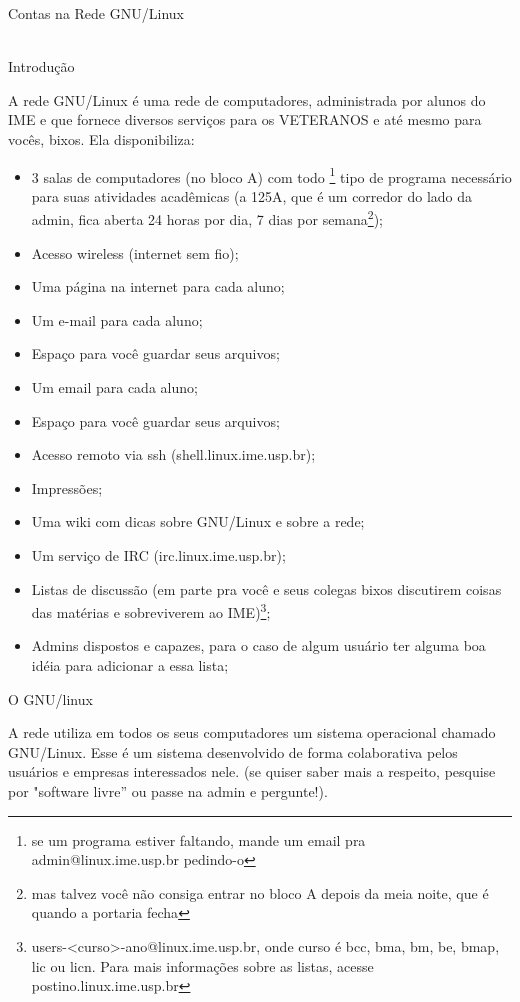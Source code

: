 \begin{secao}{Contas na Rede GNU/Linux}
\\
\\
  \begin{subsecao}{Introdução}


A rede GNU/Linux é uma rede de computadores, administrada por alunos do IME e que fornece diversos serviços para os VETERANOS e até mesmo para vocês, bixos. Ela disponibiliza:

\begin{itemize}
\item 3 salas de computadores (no bloco A) com todo \footnote{se um programa estiver faltando, mande um email pra admin@linux.ime.usp.br pedindo-o} tipo de programa necessário para suas atividades acadêmicas (a 125A, que é um corredor do lado da admin, fica aberta 24 horas por dia, 7 dias por semana\footnote{mas talvez você não consiga entrar no bloco A depois da meia noite, que é quando a portaria fecha});
\item Acesso wireless (internet sem fio);
\item Uma página na internet para cada aluno;
\item Um e-mail para cada aluno;
\item Espaço para você guardar seus arquivos;
\item Um email para cada aluno;
\item Espaço para você guardar seus arquivos;
\item Acesso remoto via ssh (shell.linux.ime.usp.br);
\item Impressões;
\item Uma wiki com dicas sobre GNU/Linux e sobre a rede;
\item Um serviço de IRC (irc.linux.ime.usp.br);
\item Listas de discussão (em parte pra você e seus colegas bixos discutirem coisas das matérias e sobreviverem ao IME)\footnote{ users-<curso>-ano@linux.ime.usp.br, onde curso é bcc, bma, bm, be, bmap, lic ou licn. Para mais informações sobre as listas, acesse postino.linux.ime.usp.br};
\item Admins dispostos e capazes, para o caso de algum usuário ter alguma boa idéia para adicionar a essa lista;
\end{itemize}
\end{subsecao}


\begin{subsecao}{O GNU/linux }

A rede utiliza em todos os seus computadores um sistema operacional chamado GNU/Linux. Esse é um sistema desenvolvido de forma colaborativa pelos usuários e empresas interessados nele. (se quiser saber mais a respeito, pesquise por "software livre” ou passe na admin e pergunte!).


\end{subsecao}
\end{secao}
